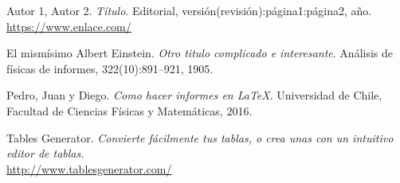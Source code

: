 		\newpage

\begin{thebibliography}{99}
	
		 Autor 1, Autor 2.
		\textit{Título}.
		Editorial, versión(revisión):página1:página2, año.
		\\\url{https://www.enlace.com/}
		
		 El mismísimo Albert Einstein. 
		\textit{Otro titulo complicado e interesante}. 
		Análisis de físicas de informes, 322(10):891–921, 1905.
	
		Pedro, Juan y Diego. 
		\textit{Como hacer informes en \LaTeX}. 
		Universidad de Chile, Facultad de Ciencias Físicas y Matemáticas, 2016.
	
		Tables Generator.
		\textit{Convierte fácilmente tus tablas, o crea unas con un intuitivo editor de tablas.}
		\\\url{http://www.tablesgenerator.com/}
	
\end{thebibliography}
